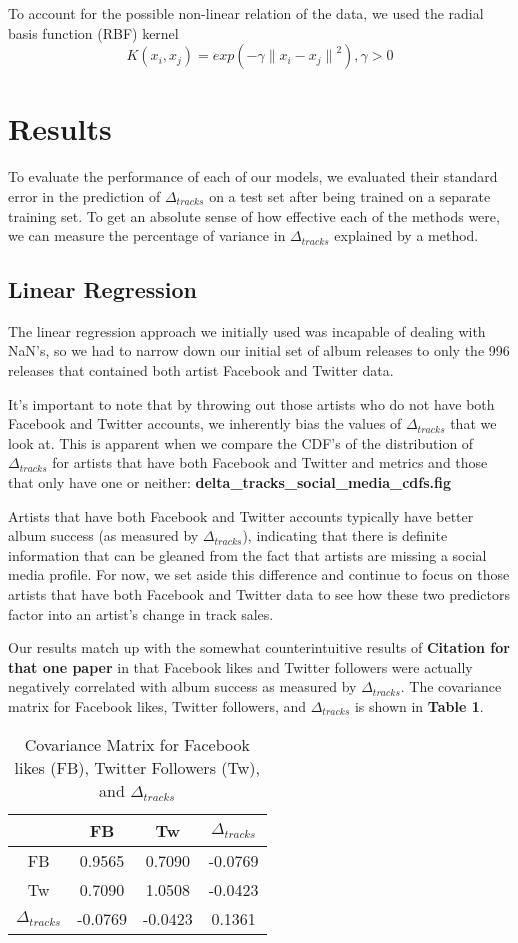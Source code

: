 \documentclass[conference]{IEEEtran}
\begin{document}
To account for the possible non-linear relation of the data, we used the radial basis function (RBF) kernel
$$K(x_i,x_j) = exp(-\gamma{\|x_i - x_j\|}^2), \gamma > 0$$

\section{Results}
To evaluate the performance of each of our models, we evaluated their standard error in the prediction of $\Delta_{tracks}$ on a test set after being trained on a separate training set. To get an absolute sense of how effective each of the methods were, we can measure the percentage of variance in $\Delta_{tracks}$ explained by a method.
\subsection{Linear Regression}
The linear regression approach we initially used was incapable of dealing with NaN's, so we had to narrow down our initial set of album releases to only the 996 releases that contained both artist Facebook and Twitter data.

It's important to note that by throwing out those artists who do not have both Facebook and Twitter accounts, we inherently bias the values of $\Delta_{tracks}$ that we look at. This is apparent when we compare the CDF's of the distribution of $\Delta_{tracks}$ for artists that have both Facebook and Twitter and metrics and those that only have one or neither: \textbf{delta\_tracks\_social\_media\_cdfs.fig}

Artists that have both Facebook and Twitter accounts typically have better album success (as measured by $\Delta_{tracks}$), indicating that there is definite information that can be gleaned from the fact that artists are missing a social media profile. For now, we set aside this difference and continue to focus on those artists that have both Facebook and Twitter data to see how these two predictors factor into an artist's change in track sales.

Our results match up with the somewhat counterintuitive results of \textbf{Citation for that one paper} in that Facebook likes and Twitter followers were actually negatively correlated with album success as measured by $\Delta_{tracks}$. The covariance matrix for Facebook likes, Twitter followers, and $\Delta_{tracks}$ is shown in \textbf{Table 1}.

\begin{table}[!t]
\renewcommand{\arraystretch}{1.3}
\caption{Covariance Matrix for Facebook likes (FB), Twitter Followers (Tw), and $\Delta_{tracks}$}
\label{covariance_1}
\centering
\begin{tabular}{c|ccc}
 & FB & Tw & $\Delta_{tracks}$\\
\hline
FB & 0.9565 & 0.7090 & -0.0769\\
Tw & 0.7090 & 1.0508 & -0.0423\\
$\Delta_{tracks}$ & -0.0769 & -0.0423 & 0.1361
\end{tabular}
\end{table}
\end{document}
